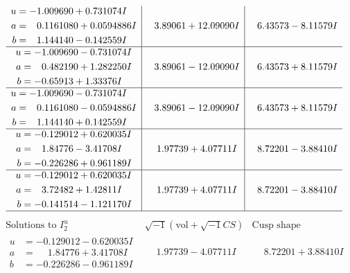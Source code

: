 \documentclass[1p]{elsarticle_modified}
\theoremstyle{definition}
\newcommand{\I}{\sqrt{-1}}
\begin{document}
$$\begin{array}{c|c|c}
\begin{aligned}
u &= -1.009690 + 0.731074 I \\
a &= \phantom{-}0.1161080 + 0.0594886 I \\
b &= \phantom{-}1.144140 - 0.142559 I\end{aligned}
 & \phantom{-}3.89061 + 12.09090 I & \phantom{-}6.43573 - 8.11579 I \\ \hline\begin{aligned}
u &= -1.009690 - 0.731074 I \\
a &= \phantom{-}0.482190 + 1.282250 I \\
b &= -0.65913 + 1.33376 I\end{aligned}
 & \phantom{-}3.89061 - 12.09090 I & \phantom{-}6.43573 + 8.11579 I \\ \hline\begin{aligned}
u &= -1.009690 - 0.731074 I \\
a &= \phantom{-}0.1161080 - 0.0594886 I \\
b &= \phantom{-}1.144140 + 0.142559 I\end{aligned}
 & \phantom{-}3.89061 - 12.09090 I & \phantom{-}6.43573 + 8.11579 I \\ \hline\begin{aligned}
u &= -0.129012 + 0.620035 I \\
a &= \phantom{-}1.84776 - 3.41708 I \\
b &= -0.226286 + 0.961189 I\end{aligned}
 & \phantom{-}1.97739 + 4.07711 I & \phantom{-}8.72201 - 3.88410 I \\ \hline\begin{aligned}
u &= -0.129012 + 0.620035 I \\
a &= \phantom{-}3.72482 + 1.42811 I \\
b &= -0.141514 - 1.121170 I\end{aligned}
 & \phantom{-}1.97739 + 4.07711 I & \phantom{-}8.72201 - 3.88410 I\\
 \hline 
 \end{array}$$\newpage$$\begin{array}{c|c|c}  
\text{Solutions to }I^u_{2}& \I (\text{vol} + \sqrt{-1}CS) & \text{Cusp shape}\\
 \hline 
\begin{aligned}
u &= -0.129012 - 0.620035 I \\
a &= \phantom{-}1.84776 + 3.41708 I \\
b &= -0.226286 - 0.961189 I\end{aligned}
 & \phantom{-}1.97739 - 4.07711 I & \phantom{-}8.72201 + 3.88410 I \\ \hline\begin{aligned}

\end{aligned}
\end{array}$$
\end{document}
